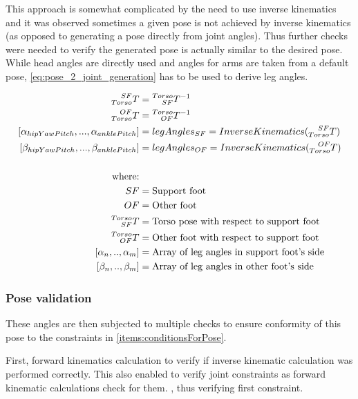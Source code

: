 \documentclass[english, printversion, nomenclature, notitle]{tuvisionthesis} %
\begin{document}
This approach is somewhat complicated by the need to use inverse kinematics and it was observed sometimes a given pose is not achieved by inverse kinematics (as opposed to generating a pose directly from joint angles). Thus further checks were needed to verify the generated pose is actually similar to the desired pose. While head angles are directly used and angles for arms are taken from a default pose, \cref{eq:pose_2_joint_generation} has to be used to derive leg angles.

\begin{equation}
\label{eq:pose_2_joint_generation}
\begin{aligned}
\prescript{SF}{Torso}{T} &= \prescript{Torso}{SF}{T}^{-1} \\
\prescript{OF}{Torso}{T} &= \prescript{Torso}{OF}{T}^{-1} \\
[\alpha_{hipYawPitch}, ... , \alpha_{anklePitch}] &= legAngles_{SF} = InverseKinematics(\prescript{SF}{Torso}{T}) \\
[\beta_{hipYawPitch}, ... , \beta_{anklePitch}] &= legAngles_{OF} = InverseKinematics(\prescript{OF}{Torso}{T}) \\ \\
\text{where:} \\
SF &= \text{Support foot} \\
OF &= \text{Other foot} \\
\prescript{Torso}{SF}{T} &= \text{Torso pose with respect to support foot} \\
\prescript{Torso}{OF}{T} &= \text{Other foot with respect to support foot} \\
[\alpha_n, .., \alpha_m] &= \text{Array of leg angles in support foot's side} \\
[\beta_n, .., \beta_m] &= \text{Array of leg angles in other foot's side}
\end{aligned}
\end{equation}

\subsubsection{Pose validation}

These angles are then subjected to multiple checks to ensure conformity of this pose to the constraints in \cref{items:conditionsForPose}. 

First, forward kinematics calculation to verify if inverse kinematic calculation was performed correctly. This also enabled to verify joint constraints as forward kinematic calculations check for them. , thus verifying first constraint.
\end{document}
